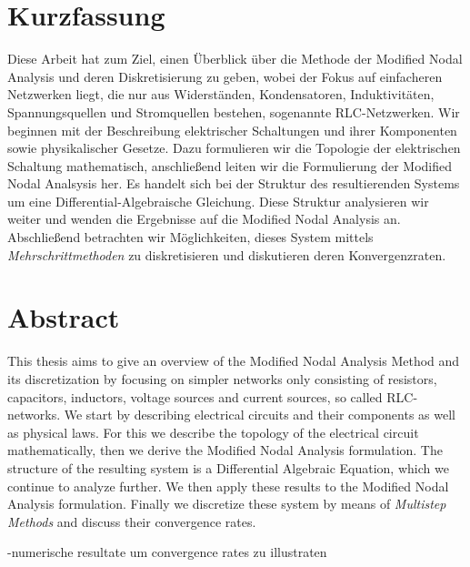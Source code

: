 
{%
	\chapter*{Kurzfassung}
	
		Diese Arbeit hat zum Ziel, einen Überblick über die Methode der Modified Nodal Analysis und deren Diskretisierung zu geben, wobei der Fokus auf einfacheren Netzwerken liegt, die nur aus Widerständen, Kondensatoren, Induktivitäten, Spannungsquellen und Stromquellen bestehen, sogenannte RLC-Netzwerken. Wir beginnen mit der Beschreibung elektrischer Schaltungen und ihrer Komponenten sowie physikalischer Gesetze. Dazu formulieren wir die Topologie der elektrischen Schaltung mathematisch, anschließend leiten wir die Formulierung der Modified Nodal Analsysis her. Es handelt sich bei der Struktur des resultierenden Systems um eine Differential-Algebraische Gleichung. Diese Struktur analysieren wir weiter und wenden die Ergebnisse auf die Modified Nodal Analysis an. Abschließend betrachten wir Möglichkeiten, dieses System mittels \emph{Mehrschrittmethoden} zu diskretisieren und diskutieren deren Konvergenzraten.
}

{%
	\chapter*{Abstract}
	
		This thesis aims to give an overview of the Modified Nodal Analysis Method and its discretization by focusing on simpler networks only consisting of resistors, capacitors, inductors, voltage sources and current sources, so called RLC-networks. We start by describing electrical circuits and their components as well as physical laws. For this we describe the topology of the electrical circuit mathematically, then we derive the Modified Nodal Analysis formulation. The structure of the resulting system is a Differential Algebraic Equation, which we continue to analyze further. We then apply these results to the Modified Nodal Analysis formulation. Finally we discretize these system by means of \emph{Multistep Methods} and discuss their convergence rates. 
		
		
		
		
		
		-numerische resultate um convergence rates zu illustraten
}